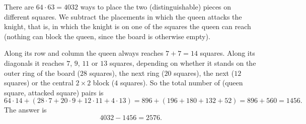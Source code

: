 There are $64\cdot63=4032$ ways to place the two (distinguishable) pieces on different squares. We subtract the placements in which the queen attacks the knight, that is, in which the knight is on one of the squares the queen can reach (nothing can block the queen, since the board is otherwise empty).

Along its row and column the queen always reaches $7+7=14$ squares. Along its diagonals it reaches $7$, $9$, $11$ or $13$ squares, depending on whether it stands on the outer ring of the board ($28$ squares), the next ring ($20$ squares), the next ($12$ squares) or the central $2\times2$ block ($4$ squares). So the total number of (queen square, attacked square) pairs is
\[64\cdot14+\left(28\cdot7+20\cdot9+12\cdot11+4\cdot13\right)=896+(196+180+132+52)=896+560=1456 .\]
The answer is
\[4032-1456=\boxed{2576}.\]
